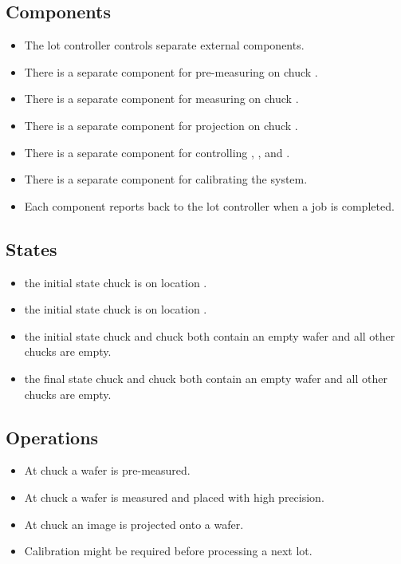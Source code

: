 \subsection{Components}
\begin{itemize}
    \item The lot controller controls separate external components.
    \item There is a separate component for pre-measuring on chuck \chuckIn.
    \item There is a separate component for measuring on chuck \chuckMeas.
    \item There is a separate component for projection on chuck \chuckProj.
    \item There is a separate component for controlling \robotOne, \robotTwo, \robotThree and \robotSwap.
    \item There is a separate component for calibrating the system.
    \item Each component reports back to the lot controller when a job is completed.
\end{itemize}

\subsection{States}
\begin{itemize}
    \item \chuckIn the initial state chuck \chuckA is on location \chuckMeas.
    \item \chuckIn the initial state chuck \chuckB is on location \chuckProj.
    \item \chuckIn the initial state chuck \chuckMeas and chuck \chuckProj both contain an empty wafer and all other chucks are empty.
    \item \chuckIn the final state chuck \chuckMeas and chuck \chuckProj both contain an empty wafer and all other chucks are empty. 
\end{itemize}

\subsection{Operations}
\begin{itemize}
    \item At chuck \chuckIn a wafer is pre-measured.
    \item At chuck \chuckMeas a wafer is measured and placed with high precision.
    \item At chuck \chuckProj an image is projected onto a wafer.
    \item Calibration might be required before processing a next lot.
\end{itemize}